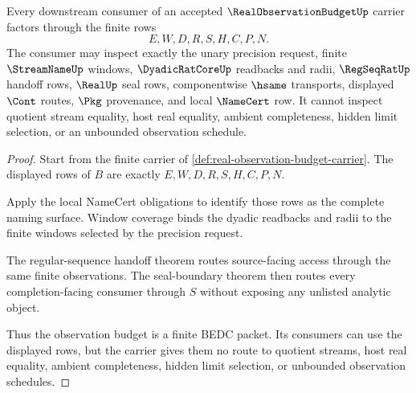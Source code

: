 \begin{theorem}
\label{thm:real-observation-budget-nonescape}
Every downstream consumer of an accepted $\RealObservationBudgetUp$ carrier factors through the finite rows
$$
E,W,D,R,S,H,C,P,N.
$$
The consumer may inspect exactly the unary precision request, finite $\StreamNameUp$ windows, $\DyadicRatCoreUp$ readbacks and radii, $\RegSeqRatUp$ handoff rows, $\RealUp$ seal rows, componentwise $\hsame$ transports, displayed $\Cont$ routes, $\Pkg$ provenance, and local $\NameCert$ row. It cannot inspect quotient stream equality, host real equality, ambient completeness, hidden limit selection, or an unbounded observation schedule.
\end{theorem}
\begin{proof}
Start from the finite carrier of \autoref{def:real-observation-budget-carrier}. The displayed rows of $B$ are exactly $E,W,D,R,S,H,C,P,N$.

Apply the local NameCert obligations to identify those rows as the complete naming surface. Window coverage binds the dyadic readbacks and radii to the finite windows selected by the precision request.

The regular-sequence handoff theorem routes source-facing access through the same finite observations. The seal-boundary theorem then routes every completion-facing consumer through $S$ without exposing any unlisted analytic object.

Thus the observation budget is a finite BEDC packet. Its consumers can use the displayed rows, but the carrier gives them no route to quotient streams, host real equality, ambient completeness, hidden limit selection, or unbounded observation schedules.
\end{proof}

